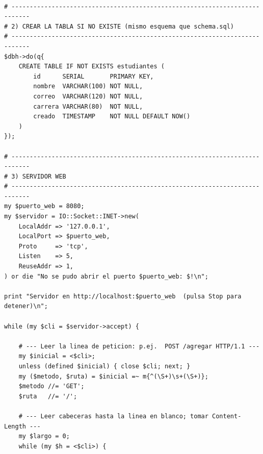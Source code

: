 \documentclass[11pt]{article}
\begin{document}
\begin{cajacodigo}
\begin{lstlisting}[style=perl]

# ---------------------------------------------------------------------------
# 2) CREAR LA TABLA SI NO EXISTE (mismo esquema que schema.sql)
# ---------------------------------------------------------------------------
$dbh->do(q{
    CREATE TABLE IF NOT EXISTS estudiantes (
        id      SERIAL       PRIMARY KEY,
        nombre  VARCHAR(100) NOT NULL,
        correo  VARCHAR(120) NOT NULL,
        carrera VARCHAR(80)  NOT NULL,
        creado  TIMESTAMP    NOT NULL DEFAULT NOW()
    )
});

# ---------------------------------------------------------------------------
# 3) SERVIDOR WEB
# ---------------------------------------------------------------------------
my $puerto_web = 8080;
my $servidor = IO::Socket::INET->new(
    LocalAddr => '127.0.0.1',
    LocalPort => $puerto_web,
    Proto     => 'tcp',
    Listen    => 5,
    ReuseAddr => 1,
) or die "No se pudo abrir el puerto $puerto_web: $!\n";

print "Servidor en http://localhost:$puerto_web  (pulsa Stop para detener)\n";

while (my $cli = $servidor->accept) {

    # --- Leer la linea de peticion: p.ej.  POST /agregar HTTP/1.1 ---
    my $inicial = <$cli>;
    unless (defined $inicial) { close $cli; next; }
    my ($metodo, $ruta) = $inicial =~ m{^(\S+)\s+(\S+)};
    $metodo //= 'GET';
    $ruta   //= '/';

    # --- Leer cabeceras hasta la linea en blanco; tomar Content-Length ---
    my $largo = 0;
    while (my $h = <$cli>) {
\end{lstlisting}
\end{cajacodigo}
\vspace{2pt}
\end{document}
